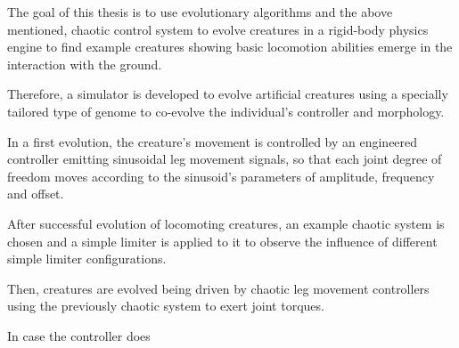\documentclass[main]{subfiles}
\begin{document}
The goal of this thesis is to use evolutionary algorithms and the above mentioned, chaotic control system to evolve creatures in a rigid-body physics engine to find example creatures showing basic locomotion abilities emerge in the interaction with the ground. %

Therefore, a simulator is developed to evolve artificial creatures using a specially tailored type of genome to co-evolve the individual's controller and morphology. %

In a first evolution, the creature's movement is controlled by an engineered controller emitting sinusoidal leg movement signals, so that each joint degree of freedom moves according to the sinusoid's parameters of amplitude, frequency and offset. %

After successful evolution of locomoting creatures, an example chaotic system is chosen and a simple limiter is applied to it to observe the influence of different simple limiter configurations. %

Then, creatures are evolved being driven by chaotic leg movement controllers using the previously chaotic system to exert joint torques. %

In case the controller does
\end{document}
